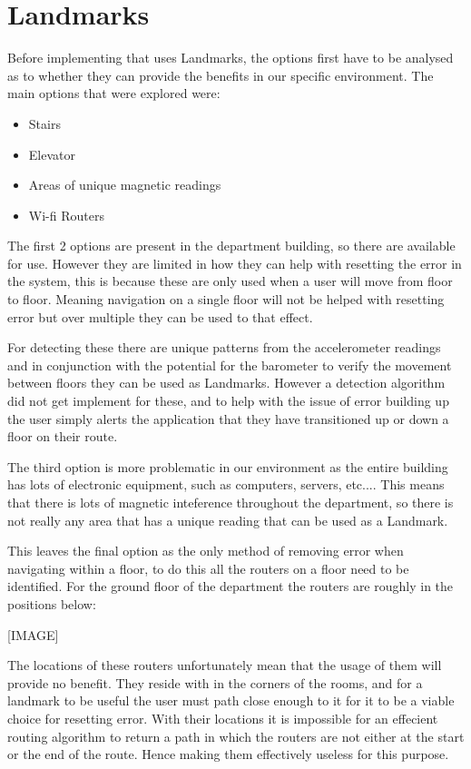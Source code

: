 \documentclass[main.tex]{subfiles}
\begin{document}
\section{Landmarks}

Before implementing that uses Landmarks, the options first have to be analysed as to whether they can provide the benefits in our specific environment. The main options that were explored were:

\begin{itemize}
	\item Stairs
	\item Elevator
	\item Areas of unique magnetic readings
	\item Wi-fi Routers
\end{itemize}

The first 2 options are present in the department building, so there are available for use. However they are limited in how they can help with resetting the error in the system, this is because these are only used when a user will move from floor to floor. Meaning navigation on a single floor will not be helped with resetting error but over multiple they can be used to that effect. 

For detecting these there are unique patterns from the accelerometer readings and in conjunction with the potential for the barometer to verify the movement between floors they can be used as Landmarks. However a detection algorithm did not get implement for these, and to help with the issue of error building up the user simply alerts the application that they have transitioned up or down a floor on their route.

The third option is more problematic in our environment as the entire building has lots of electronic equipment, such as computers, servers, etc.... This means that there is lots of magnetic inteference throughout the department, so there is not really any area that has a unique reading that can be used as a Landmark.

This leaves the final option as the only method of removing error when navigating within a floor, to do this all the routers on a floor need to be identified. For the ground floor of the department the routers are roughly in the positions below:

[IMAGE]

The locations of these routers unfortunately mean that the usage of them will provide no benefit. They reside with in the corners of the rooms, and for a landmark to be useful the user must path close enough to it for it to be a viable choice for resetting error. With their locations it is impossible for an effecient routing algorithm to return a path in which the routers are not either at the start or the end of the route. Hence making them effectively useless for this purpose.
\end{document}

